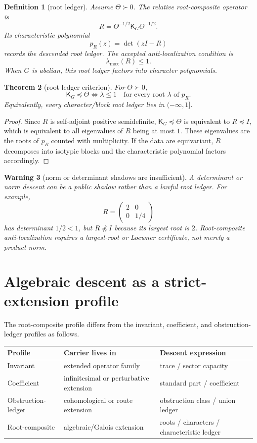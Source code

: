 \documentclass[11pt]{article}
\newtheorem{theorem}{Theorem}[section]
\newtheorem{definition}[theorem]{Definition}
\newtheorem{warning}[theorem]{Warning}
\newcommand{\K}{\mathsf K}
\begin{document}
\begin{definition}[root ledger]
Assume $\Theta\succ0$.  The relative root-composite operator is
\[
  R=\Theta^{-1/2}\K_G\Theta^{-1/2}.
\]
Its characteristic polynomial
\[
  p_R(z)=\det(zI-R)
\]
records the descended root ledger.  The accepted anti-localization condition is
\[
  \lambda_{\max}(R)\le1.
\]
When $G$ is abelian, this root ledger factors into character polynomials.
\end{definition}

\begin{theorem}[root ledger criterion]
For $\Theta\succ0$,
\[
  \K_G\preceq\Theta
  \iff
  \lambda\le1\quad\text{for every root }\lambda\text{ of }p_R.
\]
Equivalently, every character/block root ledger lies in $(-\infty,1]$.
\end{theorem}

\begin{proof}
Since $R$ is self-adjoint positive semidefinite, $\K_G\preceq\Theta$ is equivalent to $R\preceq I$, which is equivalent to all eigenvalues of $R$ being at most $1$.  These eigenvalues are the roots of $p_R$ counted with multiplicity.  If the data are equivariant, $R$ decomposes into isotypic blocks and the characteristic polynomial factors accordingly.
\end{proof}

\begin{warning}[norm or determinant shadows are insufficient]
A determinant or norm descent can be a public shadow rather than a lawful root ledger.  For example,
\[
  R=\begin{pmatrix}2&0\\0&1/4\end{pmatrix}
\]
has determinant $1/2<1$, but $R\npreceq I$ because its largest root is $2$.  Root-composite anti-localization requires a largest-root or Loewner certificate, not merely a product norm.
\end{warning}

\section{Algebraic descent as a strict-extension profile}

The root-composite profile differs from the invariant, coefficient, and obstruction-ledger profiles as follows.
\begin{center}
\begin{tabular}{lll}
\toprule
Profile & Carrier lives in & Descent expression \\
\midrule
Invariant & extended operator family & trace / sector capacity \\
Coefficient & infinitesimal or perturbative extension & standard part / coefficient \\
Obstruction-ledger & cohomological or route extension & obstruction class / union ledger \\
Root-composite & algebraic/Galois extension & roots / characters / characteristic ledger \\
\bottomrule
\end{tabular}
\end{center}
\end{document}

